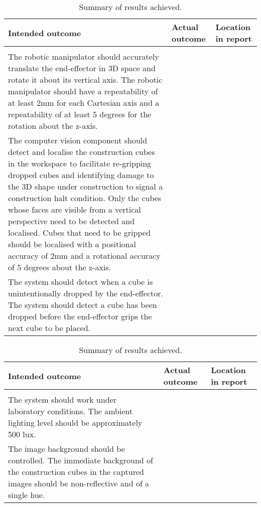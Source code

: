 \begin{table}[H]
	\renewcommand{\arraystretch}{1.3}
	\centering
	\begin{tabular}{|>{\raggedright}m{6.5cm}|>{\raggedright}m{5cm}|>{\raggedright\arraybackslash}m{3cm}|}
		\hline
		\textbf{Intended outcome} & \textbf{Actual outcome} & \textbf{Location in report} \\
		\hline
		\multicolumn{3}{|l|}{\textbf{Core mission requirements and specifications}} \\
		\hline
		The robotic manipulator should accurately translate the end-effector in 3D space and rotate it about its vertical axis. The robotic manipulator should have a repeatability of at least 2mm for each Cartesian axis and a repeatability of at least 5 degrees for the rotation about the z-axis. & & \\
		\hline
		The computer vision component should detect and localise the construction cubes in the workspace to facilitate re-gripping dropped cubes and identifying damage to the 3D shape under construction to signal a construction halt condition. Only the cubes whose faces are visible from a vertical perspective need to be detected and localised. Cubes that need to be gripped should be localised with a positional accuracy of 2mm and a rotational accuracy of 5 degrees about the z-axis. & & \\
		\hline
		The system should detect when a cube is unintentionally dropped by the end-effector. The system should detect a cube has been dropped before the end-effector grips the next cube to be placed. & & \\
		\hline
	\end{tabular}
	\caption{\label{tab:results_summary_p2}Summary of results achieved.}
\end{table}

\begin{table}[H]
	\renewcommand{\arraystretch}{1.3}
	\centering
	\begin{tabular}{|>{\raggedright}m{6.5cm}|>{\raggedright}m{5cm}|>{\raggedright\arraybackslash}m{3cm}|}
		\hline
		\textbf{Intended outcome} & \textbf{Actual outcome} & \textbf{Location in report} \\
		\hline
		\multicolumn{3}{|l|}{\textbf{Field condition requirements and specifications}} \\
		\hline
		The system should work under laboratory conditions. The ambient lighting level should be approximately 500 lux. & & \\
		\hline
		The image background should be controlled. The immediate background of the construction cubes in the captured images should be non-reflective and of a single hue.& & \\
		\hline
	\end{tabular}
	\caption{\label{tab:results_summary_p3}Summary of results achieved.}
\end{table}


